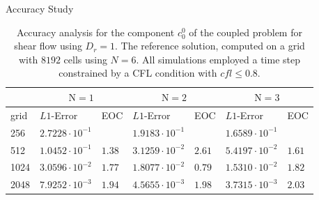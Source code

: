 \begin{frame}{Accuracy Study}
	\scriptsize
	\begin{table}[H]
		\centering
		\begin{tabular}{|l|l|l|l|l|l|l|}
			\hline 
			& \multicolumn{2}{|c|}{$\mathrm{N}=1$} & \multicolumn{2}{|c|}{$\mathrm{N}=2$} & \multicolumn{2}{|c|}{$\mathrm{N}=3$}  \\
			\hline 
			grid & $L1$-Error & EOC  & $L1$-Error & EOC  & $L1$-Error & EOC\\
			\hline
			256  & $  2.7228  \cdot 10^{-1}$ & & $ 1.9183 \cdot 10^{-1}$&&$1.6589 \cdot 10^{-1}$& \\
			\hline
			512 & $1.0452 \cdot 10^{-1}$ &$1.38$ & $ 3.1259 \cdot 10^{-2}$&$2.61$& $ 5.4197 \cdot 10^{-2}$&$1.61$\\
			\hline 
			1024  &$3.0596 \cdot 10^{-2}$&$1.77$& $1.8077 \cdot 10^{-2}$&$0.79$ & $1.5310\cdot 10^{-2}$&$1.82$\\
			\hline
			2048 & $ 7.9252\cdot 10^{-3}$ &$1.94$& $ 4.5655\cdot 10^{-3}$&$1.98$& $3.7315  \cdot 10^{-3}$&$2.03$\\
			\hline
		\end{tabular}
		\caption{Accuracy analysis for the component $c^0_0$ of the coupled problem for shear flow using $D_r=1$. The reference solution, computed on a grid with $8192$ cells using $N=6$. All simulations employed a time step constrained by a CFL condition with $cfl \leq 0.8$.}
		\label{tab:Dr=1_error_N=1,2,3vsN=6}
	\end{table}
\end{frame}


